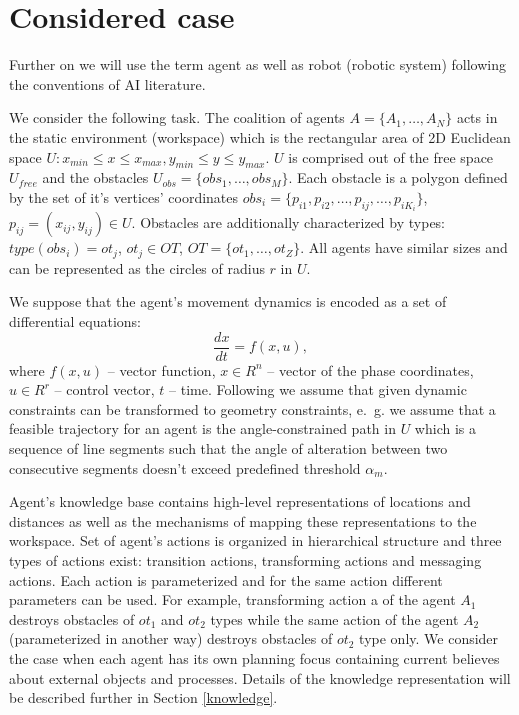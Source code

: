\documentclass[runningheads,a4paper]{llncs}
\begin{document}
\section{Considered case}\label{case}

Further on we will use the term agent as well as robot (robotic system) following the conventions of AI literature.

We consider the following task. The coalition of agents $A=\{A_1,\dots, A_N\}$ acts in the static  environment (workspace) which is the rectangular area of 2D Euclidean space $U: x_{min} \leq x \leq x_{max}, y_{min} \leq y \leq y_{max}$. $U$ is comprised out of the free space $U_{free}$ and the obstacles $U_{obs}=\{obs_1,\dots,obs_M\}$. Each obstacle is a polygon defined by the set of it's vertices' coordinates $obs_i=\{p_{i1}, p_{i2}, \dots, p_{ij}, \dots, p_{iK_i}\}$, $p_{ij}=(x_{ij}, y_{ij})\in U$. Obstacles are additionally characterized by types: $type(obs_i)=ot_j$, $ot_j\in OT$, $OT=\{ot_1, \dots, ot_Z\}$. All agents have similar sizes and can be represented as the circles of radius $r$ in $U$.

We suppose that the agent's movement dynamics is encoded as a set of differential equations:
\begin{equation}
	\frac{dx}{dt} = f(x,u),
\end{equation}
where $f(x,u)$ – vector function, $x\in R^n$ – vector of the phase coordinates, $u\in R^r$ – control vector, $t$ – time. Following \cite{Yakovlev2015a} we assume that given dynamic constraints can be transformed to geometry constraints, e.~g. we assume that a feasible trajectory for an agent is the angle-constrained path in $U$ which is a sequence of line segments such that the angle of alteration between two consecutive segments doesn't exceed predefined threshold $\alpha_m$.

Agent's knowledge base contains high-level representations of locations and distances as well as the mechanisms of mapping these representations to the workspace. Set of agent's actions is organized in hierarchical structure and three types of actions exist: transition actions, transforming actions and messaging actions. Each action is parameterized and for the same action different parameters can be used. For example, transforming action a of the agent $A_1$ destroys obstacles of $ot_1$ and $ot_2$ types while the same action of the agent $A_2$ (parameterized in another way) destroys obstacles of $ot_2$ type only. We consider the case when each agent has its own planning focus containing current believes about external objects and processes. Details of the knowledge representation will be described further in Section \ref{knowledge}.
\end{document}
